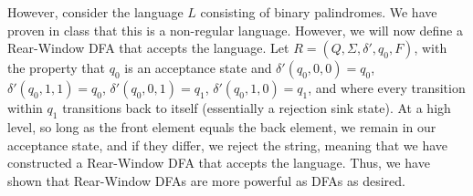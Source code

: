\documentclass[12pt]{article}
\begin{document}
\begin{enumerate}
	However, consider the language $L$ consisting of binary palindromes. We have proven in class that this is a non-regular language. However, we will now define a Rear-Window DFA that accepts the language. Let $R = (Q, \Sigma, \delta ', q_0, F)$, with the property that $q_0$ is an acceptance state and $\delta '(q_0, 0, 0) = q_0$, $\delta '(q_0, 1, 1) = q_0$, $\delta '(q_0, 0, 1) = q_1$, $\delta '(q_0, 1, 0) = q_1$, and where every transition within $q_1$ transitions back to itself (essentially a rejection sink state).
	At a high level, so long as the front element equals the back element, we remain in our acceptance state, and if they differ, we reject the string, meaning that we have constructed a Rear-Window DFA that accepts the language. Thus, we have shown that Rear-Window DFAs are more powerful as DFAs as desired.
\end{enumerate}
\end{document}
